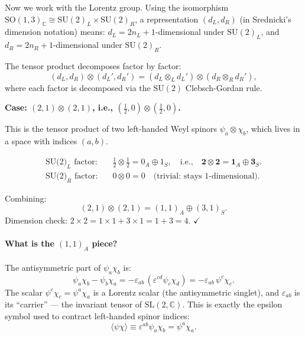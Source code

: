 Now we work with the Lorentz group.  Using the isomorphism
$\mathrm{SO}(1,3)_\mathbb{C} \cong \mathrm{SU}(2)_L \times \mathrm{SU}(2)_R$,
a representation $(d_L, d_R)$ (in Srednicki's dimension notation) means:
$d_L = 2n_L+1$-dimensional under $\mathrm{SU}(2)_L$, and
$d_R = 2n_R+1$-dimensional under $\mathrm{SU}(2)_R$.

The tensor product decomposes factor by factor:
\begin{equation}
  (d_L, d_R) \otimes (d_L', d_R')
  = (d_L \otimes_L d_L') \otimes (d_R \otimes_R d_R'),
\end{equation}
where each factor is decomposed via the $\mathrm{SU}(2)$ Clebsch-Gordan rule.

\medskip
\noindent\textbf{Case: $(2,1)\otimes(2,1)$, i.e., $(\tfrac{1}{2},0)\otimes(\tfrac{1}{2},0)$.}

This is the tensor product of two left-handed Weyl spinors $\psi_a \otimes \chi_b$,
which lives in a space with indices $(a,b)$.

\begin{align*}
  \text{SU(2)}_L\text{ factor:} &\quad
  \tfrac{1}{2}\otimes\tfrac{1}{2} = 0_A \oplus 1_S,
  \quad\text{i.e.,}\quad \mathbf{2}\otimes\mathbf{2} = \mathbf{1}_A \oplus \mathbf{3}_S.\\[3pt]
  \text{SU(2)}_R\text{ factor:} &\quad
  0\otimes 0 = 0\quad\text{(trivial: stays 1-dimensional).}
\end{align*}

Combining:
\begin{equation}
  \boxed{(2,1)\otimes(2,1) = (1,1)_A \oplus (3,1)_S.}
  \label{eq:21x21}
\end{equation}
Dimension check: $2\times 2 = 1\times 1 + 3\times 1 = 1 + 3 = 4$. $\checkmark$

\paragraph{What is the $(1,1)_A$ piece?}
The antisymmetric part of $\psi_a\chi_b$ is:
\[
  \psi_a\chi_b - \psi_b\chi_a
  = -\varepsilon_{ab}\,(\varepsilon^{cd}\psi_c\chi_d)
  = -\varepsilon_{ab}\,\psi^c\chi_c.
\]
The scalar $\psi^c\chi_c = \psi^a\chi_a$ is a Lorentz scalar (the antisymmetric
singlet), and $\varepsilon_{ab}$ is its ``carrier'' --- the invariant tensor
of $\mathrm{SL}(2,\mathbb{C})$.  This is exactly the epsilon symbol used to
contract left-handed spinor indices:
\[
  \langle\psi\chi\rangle \equiv \varepsilon^{ab}\psi_a\chi_b = \psi^a\chi_a.
\]

